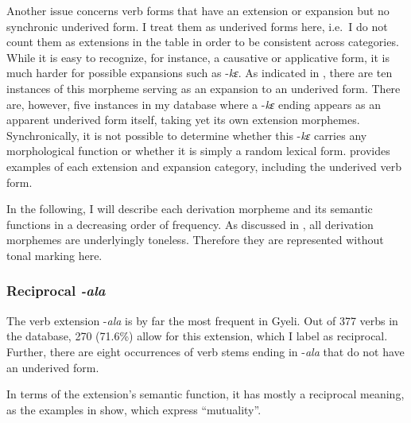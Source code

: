 \noindent Another issue concerns verb forms that have an extension or expansion but no synchronic underived form. I treat them as underived forms here, i.e.\ I do not count them as extensions in the table in order to be consistent across categories. While it is easy to recognize, for instance, a causative or applicative form, it is much harder for possible expansions such as -{\itshape kɛ}.  As indicated in , there are ten instances of this morpheme serving as an expansion to an underived form. There are, however, five instances in my database where a -{\itshape kɛ} ending appears as an apparent underived form itself, taking yet its own extension morphemes. Synchronically, it is not possible to determine whether this -{\itshape kɛ} carries any morphological function or whether it is simply a random lexical form.
 provides examples of each extension and expansion category, including the underived verb form.

In the following, I will describe each derivation morpheme and its semantic functions in a decreasing order of frequency. As discussed in , all derivation morphemes are underlyingly toneless. Therefore they are represented without tonal marking here.


\subsubsection{Reciprocal \textit{-ala}}
\label{sec:REC}

The verb extension -{\itshape ala} is by far the most frequent in Gyeli. Out of 377 verbs in the database, 270 (71.6\%) allow for this extension, which I label as reciprocal. Further, there are eight occurrences of verb stems ending in -{\itshape ala} that do not have an underived form.

In terms of the extension's semantic function, it has mostly a reciprocal meaning, as the examples in  show, which express ``mutuality''.




